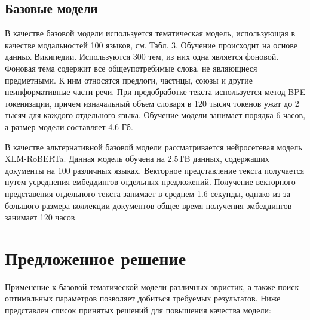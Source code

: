 \documentclass[12pt, twoside]{article}
\begin{document}
\subsection{Базовые модели}

В качестве базовой модели используется тематическая модель, использующая в качестве модальностей 100 языков, см. Табл. 3. Обучение происходит на основе данных Википедии. Используются 300 тем, из них одна является фоновой. Фоновая тема содержит все общеупотребимые слова, не являющиеся предметными. К ним относятся предлоги, частицы, союзы и другие неинформативные части речи. При предобработке текста используется метод BPE токенизации, причем изначальный объем словаря в 120 тысяч токенов ужат до 2 тысяч для каждого отдельного языка. Обучение модели занимает порядка 6 часов, а размер модели составляет 4.6 Гб. 

В качестве альтернативной базовой модели рассматривается нейросетевая модель XLM-RoBERTa\cite{Roberta}. Данная модель обучена на 2.5TB данных, содержащих документы на 100 различных языках. Векторное представление текста получается путем усреднения ембеддингов отдельных предложений. Получение векторного представения отдельного текста занимает в среднем 1.6 секунды, однако из-за большого размера коллекции документов общее время получения эмбеддингов занимает 120 часов.

\section{Предложенное решение}

Применение к базовой тематической модели различных эвристик, а также поиск оптимальных параметров позволяет добиться требуемых результатов. Ниже представлен список принятых решений для повышения качества модели:
\end{document}
